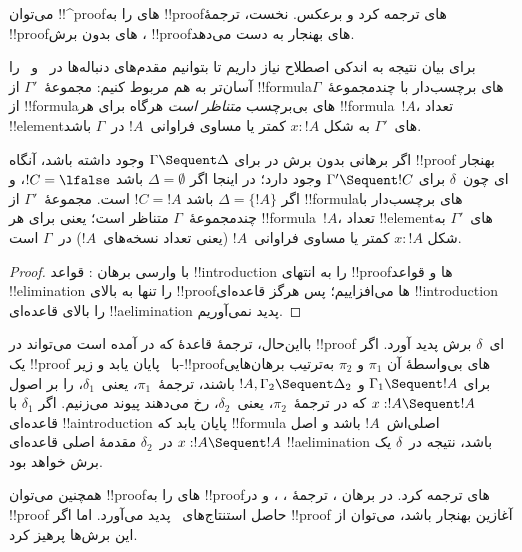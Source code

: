 \documentclass[../../../include/open-logic-section]{subfiles}
\begin{document}


می‌توان !!^{proof}های  را به !!{proof}های  ترجمه
کرد و برعکس. نخست، ترجمهٔ !!{proof}های بدون برش ،
!!{proof}های بهنجار  به دست می‌دهد.

برای بیان نتیجه به اندکی اصطلاح نیاز داریم تا بتوانیم مقدم‌های
دنباله‌ها در~ و~ را آسان‌تر به هم مربوط کنیم:
مجموعهٔ~$\Gamma'$ از !!{formula}های برچسب‌دار با چندمجموعهٔ~$\Gamma$
از !!{formula}های بی‌برچسب \emph{متناظر است} هرگاه برای هر
!!{formula}~$!A$، تعداد !!{element}های~$\Gamma'$ به شکل $x:!A$ کمتر
یا مساوی فراوانی~$!A$ در~$\Gamma$ باشد.

\begin{cor}
اگر برهانی بدون برش در  برای
$\Gamma \Sequent \Delta$ وجود داشته باشد، آنگاه !!{proof} بهنجار
ای چون~$\delta$ برای $\Gamma' \Sequent !C$ وجود دارد؛ در
اینجا اگر $\Delta=\emptyset$ باشد $!C=\lfalse$، و اگر
$\Delta=\{!A\}$ باشد $!C=!A$ است. مجموعهٔ~$\Gamma'$ از
!!{formula}های برچسب‌دار با چندمجموعهٔ~$\Gamma$ متناظر است؛ یعنی برای
هر !!{formula}~$!A$، تعداد !!{element}های~$\Gamma'$ به شکل $x:!A$
کمتر یا مساوی فراوانی~$!A$ (یعنی تعداد نسخه‌های~$!A$) در~$\Gamma$
است.
\end{cor}

\begin{proof}
با وارسی برهان : قواعد
!!{introduction} را به انتهای !!{proof}ها و قواعد !!{elimination} را
تنها به بالای !!{proof}ها می‌افزاییم؛ پس هرگز قاعده‌ای
!!{introduction} را بالای قاعده‌ای !!a{elimination} پدید نمی‌آوریم.
\end{proof}

بااین‌حال، ترجمهٔ قاعدهٔ \Cut{} که در
 آمده است می‌تواند در
!!{proof} ای~$\delta$ برش پدید آورد. اگر یک !!{proof}
 با~\Cut{} پایان یابد و زیر-!!{proof}های بی‌واسطهٔ آن
$\pi_1$ و $\pi_2$ به‌ترتیب برهان‌هایی برای
$\Gamma_1 \Sequent !A$ و $!A, \Gamma_2 \Sequent \Delta_2$ باشند،
ترجمهٔ~$\pi_1$، یعنی~$\delta_1$، را بر اصول
$x:!A \Sequent !A$ که در ترجمهٔ~$\pi_2$، یعنی~$\delta_2$، رخ
می‌دهند پیوند می‌زنیم. اگر $\delta_1$ با قاعده‌ای !!a{introduction}
پایان یابد که !!{formula} اصلی‌اش~$!A$ باشد و اصل
$x:!A \Sequent !A$ در~$\delta_2$ مقدمهٔ اصلی قاعده‌ای
!!a{elimination} باشد، نتیجه در~$\delta$ یک برش خواهد بود.

همچنین می‌توان !!{proof}های  را به !!{proof}های 
ترجمه کرد. در برهان ، ترجمهٔ
\Elim{\land}، \Elim{\lif}، \Elim{\lnot} و \Elim{\lforall} در
!!{proof} حاصل  استنتاج‌های~\Cut{} پدید می‌آورد. اما اگر
!!{proof} آغازین  بهنجار باشد، می‌توان از این برش‌ها پرهیز
کرد.
\end{document}
